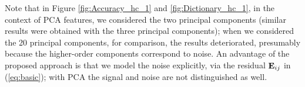 \documentclass[journal]{IEEEtran}
\begin{document}

Note that in Figure \ref{fig:Accuracy_hc_1} and  \ref{fig:Dictionary_hc_1}, in the context of PCA features, we considered the two principal components (similar results were obtained with the three principal components); when we considered the 20 principal components, for comparison, the results deteriorated, presumably because the higher-order components correspond to noise. An advantage of the proposed approach is that we model the noise explicitly, via the residual ${\mathbf E}_{ij}$ in (\ref{eq:basic}); with PCA the signal and noise are not distinguished{ as well}. 
\end{document}
